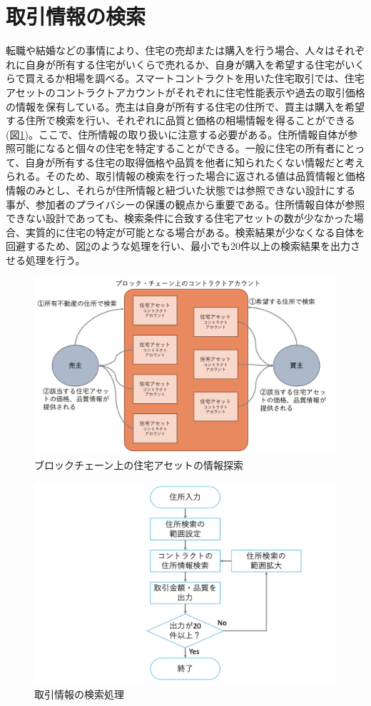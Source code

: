 \documentclass[a4paper,fontsize=11pt,report,notitlepage,line_length=38zw,number_of_lines=40,dvipdfmx]{jlreq}
\begin{document}
\section{取引情報の検索}
転職や結婚などの事情により、住宅の売却または購入を行う場合、人々はそれぞれに自身が所有する住宅がいくらで売れるか、自身が購入を希望する住宅がいくらで買えるか相場を調べる。スマートコントラクトを用いた住宅取引では、住宅アセットのコントラクトアカウントがそれぞれに住宅性能表示や過去の取引価格の情報を保有している。売主は自身が所有する住宅の住所で、買主は購入を希望する住所で検索を行い、それぞれに品質と価格の相場情報を得ることができる(図\ref{search})。ここで、住所情報の取り扱いに注意する必要がある。住所情報自体が参照可能になると個々の住宅を特定することができる。一般に住宅の所有者にとって、自身が所有する住宅の取得価格や品質を他者に知られたくない情報だと考えられる。そのため、取引情報の検索を行った場合に返される値は品質情報と価格情報のみとし、それらが住所情報と紐づいた状態では参照できない設計にする事が、参加者のプライバシーの保護の観点から重要である。住所情報自体が参照できない設計であっても、検索条件に合致する住宅アセットの数が少なかった場合、実質的に住宅の特定が可能となる場合がある。検索結果が少なくなる自体を回避するため、図\ref{flow}のような処理を行い、最小でも20件以上の検索結果を出力させる処理を行う。

\begin{figure}
 \centering
 \includegraphics[width=12cm]{search.png}
 \caption{ブロックチェーン上の住宅アセットの情報探索}
 \label{search}
\end{figure}

\begin{figure}
 \centering
 \includegraphics[width=12cm]{searchflow.png}
 \caption{取引情報の検索処理}
 \label{flow}
\end{figure}
\end{document}

